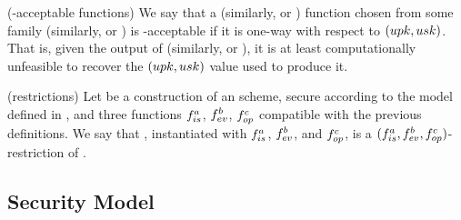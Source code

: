\begin{definition}{(\UAS-acceptable functions)}
  \label{def:uas-acc-func}
  We say that a \fissue (similarly, \feval or \finsp) function chosen from some
  family \famfissue (similarly, \famfeval or \famfinsp) is \UAS-acceptable if it
  is one-way with respect to $(upk,usk)$. That is, given the output of \fissue
  (similarly, \feval or \finsp), it is at least computationally unfeasible to
  recover the $(upk,usk)$ value used to produce it.
\end{definition}

\begin{definition}{(\CUASGen restrictions)}
  \label{def:uas-restrictions}
  Let \CUASGen be a construction of an \UAS scheme, secure according to
  the model defined in , and three functions $f_{is}^a$,
  $f_{ev}^b$, $f_{op}^c$ compatible with the previous definitions. We say that
  \CUASGen, instantiated with $f_{is}^a$, $f_{ev}^b$, and $f_{op}^c$, is a
  $(f_{is}^a,f_{ev}^b,f_{op}^c)$-restriction of \CUASGen.
\end{definition}



\subsection{Security Model}
\label{ssec:model-uas}

